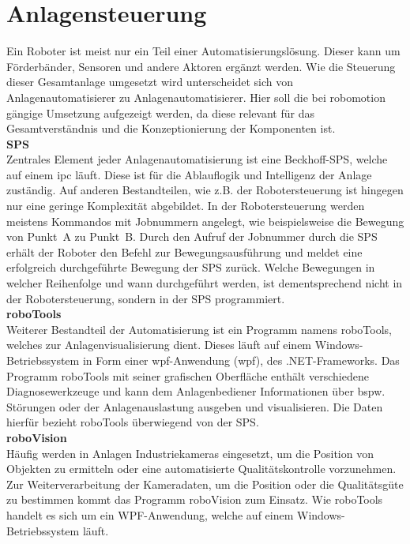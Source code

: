 \documentclass[ a4paper,
                oneside,
                toc=bibliography,
                toc=listof
                ]{scrbook}
\begin{document}
   	\section{Anlagensteuerung}
   	Ein Roboter ist meist nur ein Teil einer Automatisierungslösung. Dieser kann um Förderbänder, Sensoren und andere Aktoren ergänzt werden. Wie die Steuerung dieser Gesamtanlage umgesetzt wird unterscheidet sich von Anlagenautomatisierer zu Anlagenautomatisierer. Hier soll die bei \glqq robomotion\grqq{} gängige Umsetzung aufgezeigt werden, da diese relevant für das Gesamtverständnis und die Konzeptionierung der Komponenten ist. \\
   	\textbf{SPS}\\
   	Zentrales Element jeder Anlagenautomatisierung ist eine Beckhoff-SPS, welche auf einem \ac{ipc} läuft. Diese ist für die Ablauflogik und \glqq Intelligenz\grqq{} der Anlage zuständig. Auf anderen Bestandteilen, wie z.B. der Robotersteuerung ist hingegen nur eine geringe Komplexität abgebildet. In der Robotersteuerung werden meistens Kommandos mit Jobnummern angelegt, wie beispielsweise die Bewegung von Punkt~A zu Punkt~B. Durch den Aufruf der Jobnummer durch die SPS erhält der Roboter den Befehl zur Bewegungsausführung und meldet eine erfolgreich durchgeführte Bewegung der SPS zurück. Welche Bewegungen in welcher Reihenfolge und wann durchgeführt werden, ist dementsprechend nicht in der Robotersteuerung, sondern in der SPS programmiert.\\
   	\textbf{roboTools} \\
   	Weiterer Bestandteil der Automatisierung ist ein Programm namens \glqq roboTools\grqq, welches zur Anlagenvisualisierung dient. Dieses läuft auf einem Windows-Betriebssystem in Form einer \ac{wpf}-Anwendung (\acl{wpf}), des \glqq .NET-Frameworks\grqq. Das Programm roboTools mit seiner grafischen Oberfläche enthält verschiedene Diagnosewerkzeuge und kann dem Anlagenbediener Informationen über bspw. Störungen oder der Anlagenauslastung ausgeben und visualisieren. Die Daten hierfür bezieht roboTools überwiegend von der SPS. \\
   	\textbf{roboVision}\\
   	Häufig werden in Anlagen Industriekameras eingesetzt, um die Position von Objekten zu ermitteln oder eine automatisierte Qualitätskontrolle vorzunehmen. Zur Weiterverarbeitung der Kameradaten, um die Position oder die Qualitätsgüte zu bestimmen kommt das Programm \glqq roboVision\grqq{} zum Einsatz. Wie roboTools handelt es sich um ein WPF-Anwendung, welche auf einem Windows-Betriebssystem läuft. \\
\end{document}
